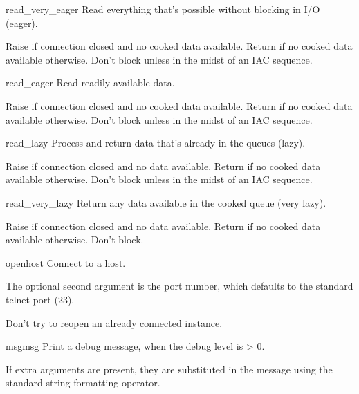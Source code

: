 \begin{methoddesc}[Telnet]{read_very_eager}{}
Read everything that's possible without blocking in I/O (eager).

Raise  if connection closed and no cooked data
available.  Return  if no cooked data available otherwise.
Don't block unless in the midst of an IAC sequence.
\end{methoddesc}

\begin{methoddesc}[Telnet]{read_eager}{}
Read readily available data.

Raise  if connection closed and no cooked data
available.  Return  if no cooked data available otherwise.
Don't block unless in the midst of an IAC sequence.
\end{methoddesc}

\begin{methoddesc}[Telnet]{read_lazy}{}
Process and return data that's already in the queues (lazy).

Raise  if connection closed and no data available.
Return  if no cooked data available otherwise.  Don't block
unless in the midst of an IAC sequence.
\end{methoddesc}

\begin{methoddesc}[Telnet]{read_very_lazy}{}
Return any data available in the cooked queue (very lazy).

Raise  if connection closed and no data available.
Return  if no cooked data available otherwise.  Don't block.
\end{methoddesc}

\begin{methoddesc}[Telnet]{open}{host}
Connect to a host.

The optional second argument is the port number, which
defaults to the standard telnet port (23).

Don't try to reopen an already connected instance.
\end{methoddesc}

\begin{methoddesc}[Telnet]{msg}{msg}
Print a debug message, when the debug level is > 0.

If extra arguments are present, they are substituted in the
message using the standard string formatting operator.
\end{methoddesc}

